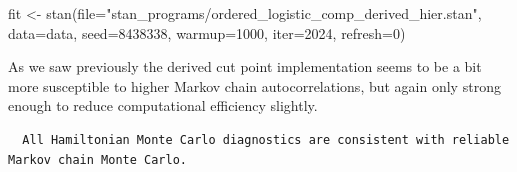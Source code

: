 \documentclass[
  letterpaper,
  DIV=11,
  numbers=noendperiod]{scrartcl}
\newenvironment{Shaded}{\begin{snugshade}}{\end{snugshade}}
\newcommand{\AttributeTok}[1]{\textcolor[rgb]{0.40,0.45,0.13}{#1}}
\newcommand{\ConstantTok}[1]{\textcolor[rgb]{0.56,0.35,0.01}{#1}}
\newcommand{\DecValTok}[1]{\textcolor[rgb]{0.68,0.00,0.00}{#1}}
\newcommand{\FunctionTok}[1]{\textcolor[rgb]{0.28,0.35,0.67}{#1}}
\newcommand{\NormalTok}[1]{\textcolor[rgb]{0.00,0.23,0.31}{#1}}
\newcommand{\OtherTok}[1]{\textcolor[rgb]{0.00,0.23,0.31}{#1}}
\newcommand{\SpecialCharTok}[1]{\textcolor[rgb]{0.37,0.37,0.37}{#1}}
\newcommand{\StringTok}[1]{\textcolor[rgb]{0.13,0.47,0.30}{#1}}
\begin{document}
\begin{Shaded}
\begin{Highlighting}[]
\NormalTok{fit }\OtherTok{\textless{}{-}} \FunctionTok{stan}\NormalTok{(}\AttributeTok{file=}\StringTok{"stan\_programs/ordered\_logistic\_comp\_derived\_hier.stan"}\NormalTok{,}
            \AttributeTok{data=}\NormalTok{data, }\AttributeTok{seed=}\DecValTok{8438338}\NormalTok{,}
            \AttributeTok{warmup=}\DecValTok{1000}\NormalTok{, }\AttributeTok{iter=}\DecValTok{2024}\NormalTok{, }\AttributeTok{refresh=}\DecValTok{0}\NormalTok{)}
\end{Highlighting}
\end{Shaded}

As we saw previously the derived cut point implementation seems to be a
bit more susceptible to higher Markov chain autocorrelations, but again
only strong enough to reduce computational efficiency slightly.

\begin{Shaded}
\end{Shaded}

\begin{verbatim}
  All Hamiltonian Monte Carlo diagnostics are consistent with reliable
Markov chain Monte Carlo.
\end{verbatim}

\begin{Shaded}
\end{Shaded}
\end{document}
